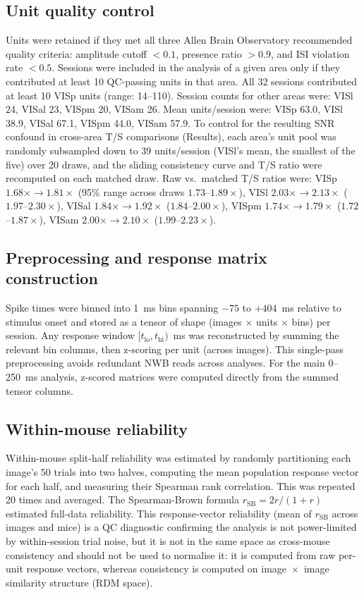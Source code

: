 \documentclass[11pt,onecolumn]{article}
\begin{document}
\subsection{Unit quality control}

Units were retained if they met all three Allen Brain Observatory
recommended quality criteria: amplitude cutoff $< 0.1$, presence ratio
$> 0.9$, and ISI violation rate $< 0.5$.  Sessions were included in the
analysis of a given area only if they contributed at least 10 QC-passing
units in that area.  All 32 sessions contributed at least 10 VISp units
(range: 14--110).  Session counts for other areas were: VISl 24,
VISal 23, VISpm 20, VISam 26.  Mean units/session were: VISp 63.0,
VISl 38.9, VISal 67.1, VISpm 44.0, VISam 57.9.  To control for the
resulting SNR confound in cross-area T/S comparisons (Results), each
area's unit pool was randomly subsampled down to 39 units/session (VISl's
mean, the smallest of the five) over 20 draws, and the sliding
consistency curve and T/S ratio were recomputed on each matched draw.
Raw vs.\ matched T/S ratios were: VISp $1.68\times \to 1.81\times$
(95\% range across draws $1.73$--$1.89\times$), VISl
$2.03\times \to 2.13\times$ ($1.97$--$2.30\times$), VISal
$1.84\times \to 1.92\times$ ($1.84$--$2.00\times$), VISpm
$1.74\times \to 1.79\times$ ($1.72$--$1.87\times$), VISam
$2.00\times \to 2.10\times$ ($1.99$--$2.23\times$).

\subsection{Preprocessing and response matrix construction}

Spike times were binned into 1~ms bins spanning $-75$ to $+404$~ms
relative to stimulus onset and stored as a tensor of shape
(images $\times$ units $\times$ bins) per session.  Any response window
$[t_\mathrm{lo}, t_\mathrm{hi})$~ms was reconstructed by summing the
relevant bin columns, then z-scoring per unit (across images).  This
single-pass preprocessing avoids redundant NWB reads across analyses.
For the main 0--250~ms analysis, z-scored matrices were computed
directly from the summed tensor columns.

\subsection{Within-mouse reliability}

Within-mouse split-half reliability was estimated by randomly partitioning
each image's 50 trials into two halves, computing the mean population
response vector for each half, and measuring their Spearman rank
correlation.  This was repeated 20 times and averaged.  The Spearman-Brown
formula $r_\mathrm{SB} = 2r/(1+r)$ estimated full-data reliability.  This
response-vector reliability (mean of $r_\mathrm{SB}$ across images and
mice) is a QC diagnostic confirming the analysis is not power-limited by
within-session trial noise, but it is not in the same space as
cross-mouse consistency and should not be used to normalise it: it is
computed from raw per-unit response vectors, whereas consistency is
computed on image~$\times$~image similarity structure (RDM space).
\end{document}
